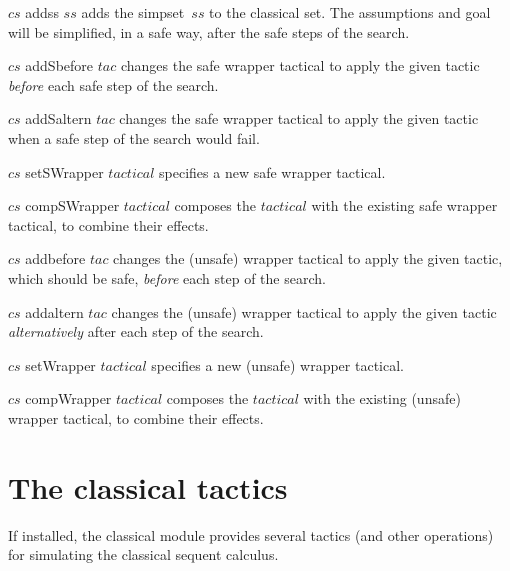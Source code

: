 \begin{ttdescription}
\item[$cs$ addss $ss$] 
adds the simpset~$ss$ to the classical set. The assumptions and goal will be
simplified, in a safe way, after the safe steps of the search.

\item[$cs$ addSbefore $tac$] 
changes the safe wrapper tactical to apply the given tactic {\em before}
each safe step of the search.

\item[$cs$ addSaltern $tac$] 
changes the safe wrapper tactical to apply the given tactic when a safe step 
of the search would fail.

\item[$cs$ setSWrapper $tactical$] 
specifies a new safe wrapper tactical.  

\item[$cs$ compSWrapper $tactical$] 
composes the $tactical$ with the existing safe wrapper tactical, 
to combine their effects. 

\item[$cs$ addbefore $tac$] 
changes the (unsafe) wrapper tactical to apply the given tactic, which should
be safe, {\em before} each step of the search.

\item[$cs$ addaltern $tac$] 
changes the (unsafe) wrapper tactical to apply the given tactic 
{\em alternatively} after each step of the search.

\item[$cs$ setWrapper $tactical$] 
specifies a new (unsafe) wrapper tactical.  

\item[$cs$ compWrapper $tactical$] 
composes the $tactical$ with the existing (unsafe) wrapper tactical, 
to combine their effects. 
\end{ttdescription}


\section{The classical tactics}
If installed, the classical module provides several tactics (and other
operations) for simulating the classical sequent calculus.

